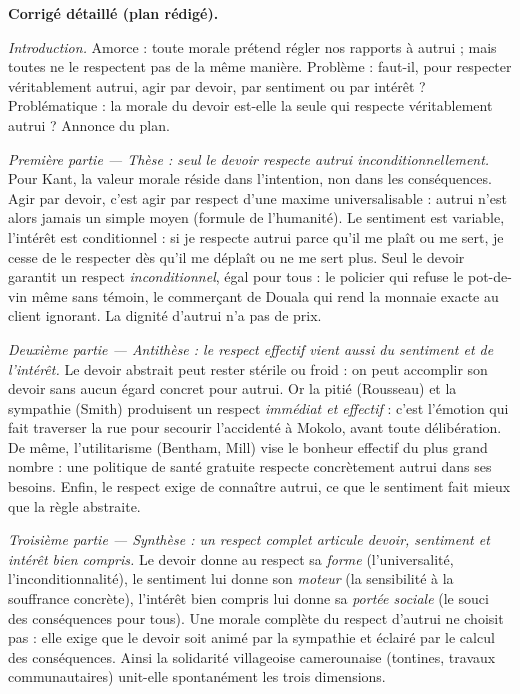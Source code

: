 \documentclass[11pt]{article}
\begin{document}
\begin{corrige}
\textbf{Corrigé détaillé (plan rédigé).}

\emph{Introduction.} Amorce : toute morale prétend régler nos rapports à autrui ; mais toutes ne le respectent pas de la même manière. Problème : faut-il, pour respecter véritablement autrui, agir par devoir, par sentiment ou par intérêt ? Problématique : la morale du devoir est-elle la seule qui respecte véritablement autrui ? Annonce du plan.

\emph{Première partie — Thèse : seul le devoir respecte autrui inconditionnellement.} Pour Kant, la valeur morale réside dans l'intention, non dans les conséquences. Agir par devoir, c'est agir par respect d'une maxime universalisable : autrui n'est alors jamais un simple moyen (formule de l'humanité). Le sentiment est variable, l'intérêt est conditionnel : si je respecte autrui parce qu'il me plaît ou me sert, je cesse de le respecter dès qu'il me déplaît ou ne me sert plus. Seul le devoir garantit un respect \emph{inconditionnel}, égal pour tous : le policier qui refuse le pot-de-vin même sans témoin, le commerçant de Douala qui rend la monnaie exacte au client ignorant. La dignité d'autrui n'a pas de prix.

\emph{Deuxième partie — Antithèse : le respect effectif vient aussi du sentiment et de l'intérêt.} Le devoir abstrait peut rester stérile ou froid : on peut accomplir son devoir sans aucun égard concret pour autrui. Or la pitié (Rousseau) et la sympathie (Smith) produisent un respect \emph{immédiat et effectif} : c'est l'émotion qui fait traverser la rue pour secourir l'accidenté à Mokolo, avant toute délibération. De même, l'utilitarisme (Bentham, Mill) vise le bonheur effectif du plus grand nombre : une politique de santé gratuite respecte concrètement autrui dans ses besoins. Enfin, le respect exige de connaître autrui, ce que le sentiment fait mieux que la règle abstraite.

\emph{Troisième partie — Synthèse : un respect complet articule devoir, sentiment et intérêt bien compris.} Le devoir donne au respect sa \emph{forme} (l'universalité, l'inconditionnalité), le sentiment lui donne son \emph{moteur} (la sensibilité à la souffrance concrète), l'intérêt bien compris lui donne sa \emph{portée sociale} (le souci des conséquences pour tous). Une morale complète du respect d'autrui ne choisit pas : elle exige que le devoir soit animé par la sympathie et éclairé par le calcul des conséquences. Ainsi la solidarité villageoise camerounaise (tontines, travaux communautaires) unit-elle spontanément les trois dimensions.


\end{corrige}
\end{document}
